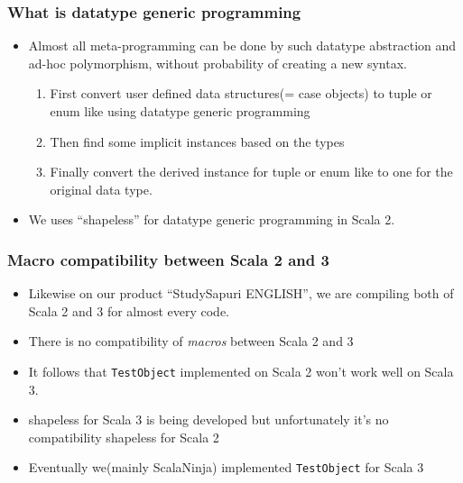 \begin{frame}
  \frametitle{What is datatype generic programming}
  
  \begin{itemize}
    \item Almost all meta-programming can be done by such datatype abstraction
    and ad-hoc polymorphism, without probability of creating a new syntax.
    \begin{enumerate}
      \item First convert user defined data structures(= case objects) to tuple or enum like using datatype generic programming
      \item Then find some implicit instances based on the types
      \item Finally convert the derived instance for tuple or enum like to one for the original data type.
    \end{enumerate}

    \item We uses ``shapeless''\cite{shapeless_github} for datatype generic programming in Scala 2.
  \end{itemize}

\end{frame}

\begin{frame}
  \frametitle{Macro compatibility between Scala 2 and 3}

  \begin{itemize}
    \item Likewise on our product ``StudySapuri ENGLISH'', 
    we are compiling both of Scala 2 and 3 for almost every code.

    \item There is no compatibility of \emph{macros} between Scala 2 and 3 

    \item It follows that \lstinline|TestObject| implemented on Scala 2 won't work well on Scala 3.

    \item shapeless for Scala 3 is being developed but unfortunately
     it's no compatibility shapeless for Scala 2 

    \item Eventually we(mainly ScalaNinja) implemented \lstinline|TestObject| for Scala 3
  \end{itemize}
\end{frame}

